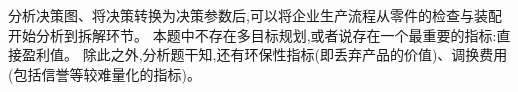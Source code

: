 分析决策图、将决策转换为决策参数后,可以将企业生产流程从零件的检查与装配开始分析到拆解环节。
本题中不存在多目标规划,或者说存在一个最重要的指标:直接盈利值。
除此之外,分析题干知,还有环保性指标(即丢弃产品的价值)、调换费用(包括信誉等较难量化的指标)。

